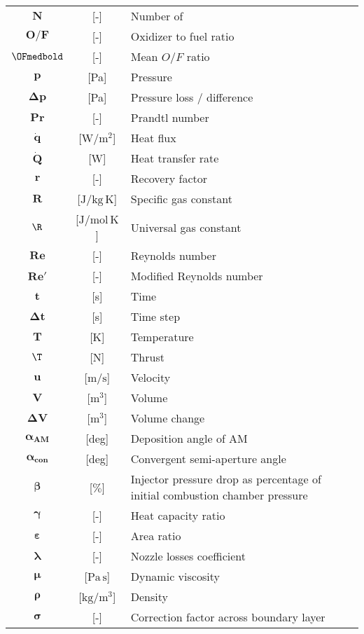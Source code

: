 \begin{multicols}{2}
{\begin{xltabular}{\linewidth}{cc>{\raggedright\arraybackslash}X}
		$\boldsymbol{N}$ & [-] & Number of \\
		$\boldsymbol{O/F}$ & [-] & Oxidizer to fuel ratio \\
		$\OFmedbold$ & [-] & Mean $O/F$ ratio \\ 
		$\boldsymbol{p}$ & [Pa] & Pressure \\
		$\boldsymbol{\Delta p}$ & [Pa] & Pressure loss / difference \\
		$\boldsymbol{Pr}$ & [-] & Prandtl number \\
		$\boldsymbol{\dot{q}}$ & [$\textrm{W} / \textrm{m}^2$] & Heat flux \\
		$\boldsymbol{\dot{Q}}$ & [W] & Heat transfer rate \\
		$\boldsymbol{r}$ & [-] & Recovery factor \\
		$\boldsymbol{R}$ & [$\textrm{J} / \textrm{kg} \, \textrm{K}$] & Specific gas constant \\
		$\boldsymbol{\R}$ & [$\textrm{J} / \textrm{mol} \, \textrm{K}$] & Universal gas constant \\
		$\boldsymbol{Re}$ & [-] & Reynolds number \\
		$\boldsymbol{Re'}$ & [-] & Modified Reynolds number \\
		$\boldsymbol{t}$ & [s] & Time \\
		$\boldsymbol{\Delta t}$ & [s] & Time step \\
		$\boldsymbol{T}$ & [K] & Temperature \\
		$\boldsymbol{\T}$ & [N] & Thrust \\
		$\boldsymbol{u}$ & [$\textrm{m} / \textrm{s}$] & Velocity \\
		$\boldsymbol{V}$ & [$\textrm{m}^3$] & Volume \\
		$\boldsymbol{\Delta V}$ & [$\textrm{m}^3$] & Volume change \\
		$\boldsymbol{\alpha_{AM}}$ & [deg] & Deposition angle of AM \\
		$\boldsymbol{\alpha_{con}}$ & [deg] & Convergent semi-aperture angle \\
		$\boldsymbol{\beta}$ & [$\%$] & Injector pressure drop as percentage of initial combustion chamber pressure \\ 
		$\boldsymbol{\gamma}$ & [-] & Heat capacity ratio \\
		$\boldsymbol{\varepsilon}$ & [-] & Area ratio \\
		$\boldsymbol{\lambda}$ & [-] & Nozzle losses coefficient \\
		$\boldsymbol{\mu}$ & [$\textrm{Pa} \, \textrm{s}$] & Dynamic viscosity \\
		$\boldsymbol{\rho}$ & [$\textrm{kg} / \textrm{m}^3$] & Density \\
		$\boldsymbol{\sigma}$ & [-] & Correction factor across boundary layer \\
	\end{xltabular}
	\unskip
	\unpenalty
	\unpenalty}
	\unvbox\ltmcbox
\end{multicols}


